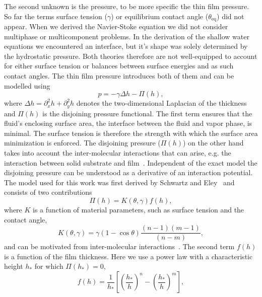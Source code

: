 The second unknown is the pressure, to be more specific the thin film pressure.
So far the terms surface tension ($\gamma$) or equilibrium contact angle ($\theta_{\text{eq}}$) did not appear.
When we derived the Navier-Stoke equation we did not consider multiphase or multicomponent problems. 
In the derivation of the shallow water equations we encountered an interface, but it's shape was solely determined by the hydrostatic pressure.
Both theories therefore are not well-equipped to account for either surface tension or balances between surface energies and as such contact angles.
The thin film pressure introduces both of them and can be modelled using
\begin{equation}\label{eq:thin_film_pressure}
    p = -\gamma \Delta h - \Pi(h),
\end{equation}
where $\Delta h = \partial_x^2 h + \partial_y^2 h$ denotes the two-dimensional Laplacian of the thickness and $\Pi(h)$ is the disjoining pressure functional.
The first term ensures that the fluid's enclosing surface area, the interface between the fluid and vapor phase, is minimal.
The surface tension is therefore the strength with which the surface area minimization is enforced.
The disjoining pressure ($\Pi(h)$) on the other hand takes into account the inter-molecular interactions that can arise, e.g. the interaction between solid substrate and film~\cite{crasterDynamicsStabilityThin2009, moultonEffectDisjoiningPressure2013}.
Independent of the exact model the disjoining pressure can be understood as a derivative of an interaction potential.
The model used for this work was first derived by Schwartz and Eley~\cite{schwartzSimulationDropletMotion1998} and consists of two contributions
\begin{equation}\label{eq:disj_pressure_one}
    \Pi(h) = K(\theta, \gamma) f(h),
\end{equation}
where $K$ is a function of material parameters, such as surface tension and the contact angle, 
\begin{equation}\label{eq:disj_kappa}
    K(\theta, \gamma) = \gamma (1 - \cos\theta) \frac{(n-1)(m-1)}{(n-m)},
\end{equation}
and can be motivated from inter-molecular interactions~\cite{mahadyVolumeFluidMethod2015}.
The second term $f(h)$ is a function of the film thickness.
Here we use a power law with a characteristic height $h_{\ast}$ for which $\Pi(h_{\ast}) = 0$,
\begin{equation}\label{eq:disj_fofh}
    f(h) = \frac{1}{h_{\ast}}\left[\left(\frac{h_{\ast}}{h}\right)^n - \left(\frac{h_{\ast}}{h}\right)^m \right],
\end{equation}
